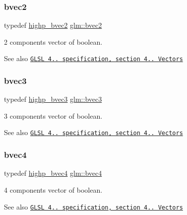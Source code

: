 \subsubsection{\texorpdfstring{bvec2}{bvec2}}
{\footnotesize\ttfamily typedef \mbox{\hyperlink{group__core__precision_gad8f63e4c7546320f6b72808fadfda3c2}{highp\+\_\+bvec2}} \mbox{\hyperlink{group__core__types_ga7523cf292181cf7daef3aa0a3267d8e3}{glm\+::bvec2}}}

2 components vector of boolean.

\begin{DoxySeeAlso}{See also}
\href{http://www.opengl.org/registry/doc/GLSLangSpec.4.20.8.pdf}{\tt G\+L\+SL 4.. specification, section 4.. Vectors} 
\end{DoxySeeAlso}
\mbox{\label{group__core__types_ga3f07d6d37fc6fe875170fd5799685bcf}} 
\subsubsection{\texorpdfstring{bvec3}{bvec3}}
{\footnotesize\ttfamily typedef \mbox{\hyperlink{group__core__precision_ga0e3365e13160aa93d2a9c68529a013ce}{highp\+\_\+bvec3}} \mbox{\hyperlink{group__core__types_ga3f07d6d37fc6fe875170fd5799685bcf}{glm\+::bvec3}}}

3 components vector of boolean.

\begin{DoxySeeAlso}{See also}
\href{http://www.opengl.org/registry/doc/GLSLangSpec.4.20.8.pdf}{\tt G\+L\+SL 4.. specification, section 4.. Vectors} 
\end{DoxySeeAlso}
\mbox{\label{group__core__types_ga6bb211b3d3bebae3867548d5673ca5cd}} 
\subsubsection{\texorpdfstring{bvec4}{bvec4}}
{\footnotesize\ttfamily typedef \mbox{\hyperlink{group__core__precision_gaa99e0301060bf06e7750c1c3591b6b4e}{highp\+\_\+bvec4}} \mbox{\hyperlink{group__core__types_ga6bb211b3d3bebae3867548d5673ca5cd}{glm\+::bvec4}}}

4 components vector of boolean.

\begin{DoxySeeAlso}{See also}
\href{http://www.opengl.org/registry/doc/GLSLangSpec.4.20.8.pdf}{\tt G\+L\+SL 4.. specification, section 4.. Vectors} 
\end{DoxySeeAlso}
\mbox{\label{group__core__types_gad8c130d26c4cd9a1a831c1a74292a8f6}} 
